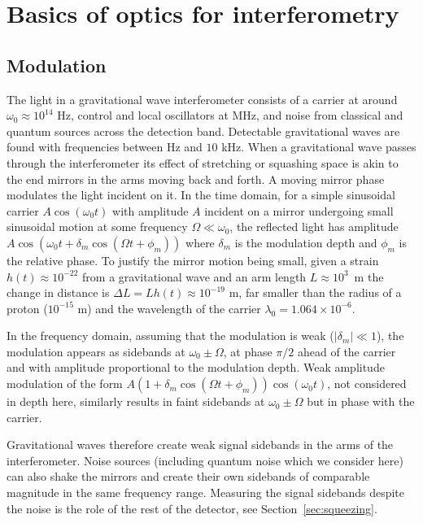 \documentclass[aps,pra,superscriptaddress,reprint,nofootinbib]{revtex4-1}
\newcommand{\abs}[1]{\left\lvert #1 \right\rvert}
\begin{document}
\section{Basics of optics for interferometry}
\label{sec:basics}

\subsection{Modulation}

The light in a gravitational wave interferometer consists of a carrier at around $\omega_0 \approx 10^{14}$ Hz, control and local oscillators at MHz, and noise from classical and quantum sources across the detection band. Detectable gravitational waves are found with frequencies between Hz and $10$ kHz. When a gravitational wave passes through the interferometer its effect of stretching or squashing space is akin to the end mirrors in the arms moving back and forth. A moving mirror phase modulates the light incident on it. In the time domain, for a simple sinusoidal carrier $A \cos(\omega_0 t)$ with amplitude $A$ incident on a mirror undergoing small sinusoidal motion at some frequency $\Omega \ll \omega_0$, the reflected light has amplitude $A \cos(\omega_0 t + \delta_m \cos(\Omega t + \phi_m))$ where $\delta_m$ is the modulation depth and $\phi_m$ is the relative phase. To justify the mirror motion being small, given a strain $h(t) \approx 10^{-22}$ from a gravitational wave and an arm length $L \approx 10^3$~m the change in distance is $\Delta L = L h(t) \approx 10^{-19}$ m, far smaller than the radius of a proton ($10^{-15}$ m) and the wavelength of the carrier $\lambda_0 = 1.064 \times 10^{-6}$.


In the frequency domain, assuming that the modulation is weak ($\abs{\delta_m} \ll 1$), the modulation appears as sidebands at $\omega_0 \pm \Omega$, at phase $\pi/2$ ahead of the carrier and with amplitude proportional to the modulation depth.
Weak amplitude modulation of the form $A (1 + \delta_m \cos(\Omega t + \phi_m)) \cos(\omega_0 t)$, not considered in depth here, similarly results in faint sidebands at $\omega_0 \pm \Omega$ but in phase with the carrier.


Gravitational waves therefore create weak signal sidebands in the arms of the interferometer. Noise sources (including quantum noise which we consider here) can also shake the mirrors and create their own sidebands of comparable magnitude in the same frequency range. Measuring the signal sidebands despite the noise is the role of the rest of the detector, see Section~\ref{sec:squeezing}.
\end{document}
